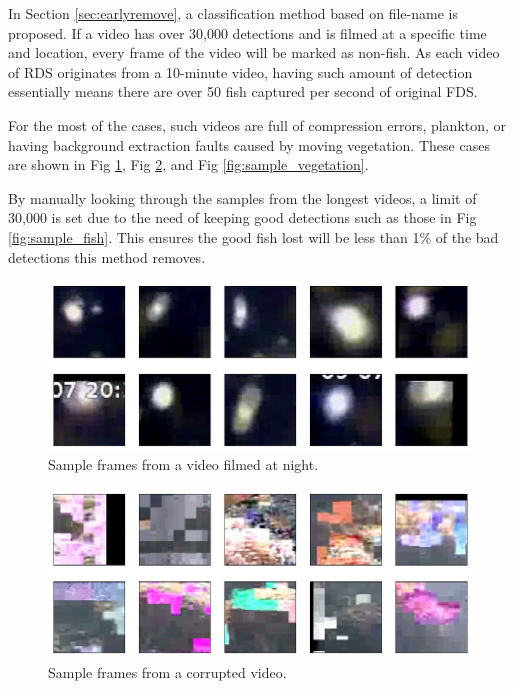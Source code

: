 \documentclass[bsc,frontabs,twoside,fullspacing,parskip,deptreport]{infthesis}
\begin{document}
\begin{appendices}
In Section \ref{sec:earlyremove}, a classification method based on file-name is proposed.
If a video has over 30,000 detections and is filmed at a specific time and location, every frame of the video will be marked as non-fish. 
As each video of RDS originates from a 10-minute video, having such amount of detection essentially means there are over 50 fish captured per second of original FDS.

For the most of the cases, such videos are full of compression errors, plankton, or having background extraction faults caused by moving vegetation. These cases are shown in Fig \ref{fig:sample_night}, Fig \ref{fig:sample_corrupt}, and Fig \ref{fig:sample_vegetation}.

By manually looking through the samples from the longest videos, a limit of 30,000 is set due to the need of keeping good detections such as those in Fig \ref{fig:sample_fish}. This ensures the good fish lost will be less than 1\% of the bad detections this method removes.

\begin{figure}
\centering
    \includegraphics[scale=0.46]{graph/sample_night.png}
    \caption{Sample frames from a video filmed at night.}
    \label{fig:sample_night}
\end{figure}

\begin{figure}
\centering
    \includegraphics[scale=0.46]{graph/sample_corrupt.png}
    \caption{Sample frames from a corrupted video.}
    \label{fig:sample_corrupt}
\end{figure}


\end{appendices}
\end{document}
